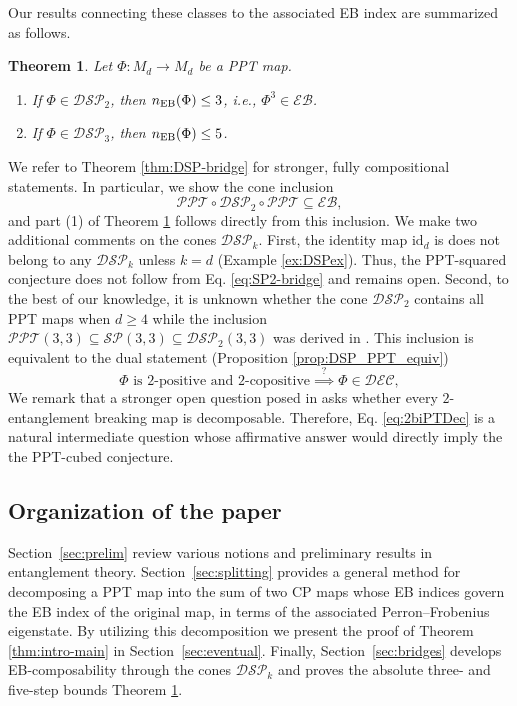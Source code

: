 \documentclass[11pt,reqno]{amsart}
\newtheorem{theorem}{Theorem}[section]
\theoremstyle{definition}
\theoremstyle{definition}
\theoremstyle{definition}
\theoremstyle{definition}
\newcommand{\id}{\mathrm{id}}
\newcommand{\SP}{\mathcal{SP}}
\newcommand{\DSP}{\mathcal{DSP}}
\newcommand{\EB}{\mathcal{EB}}
\newcommand{\PPT}{\mathcal{PPT}}
\newcommand{\DEC}{\mathcal{DEC}}
\begin{document}
Our results connecting these classes to the associated EB index are summarized as follows.

\begin{theorem}\label{thm:intro-low-bridge}
Let $\Phi:M_d\to M_d$ be a PPT map.
\begin{enumerate}
    \item If $\Phi\in \DSP_2$, then $n_{\rm EB}(\Phi)\leq 3$, i.e., $\Phi^3\in \EB$.
    
    \item If $\Phi\in \DSP_3$, then $n_{\rm EB}(\Phi)\leq 5$.
\end{enumerate}
\end{theorem}

We refer to Theorem \ref{thm:DSP-bridge} for stronger, fully compositional statements. In particular, we show the cone inclusion
\begin{equation} \label{eq:SP2-bridge}
    \PPT \circ \DSP_2 \circ \PPT \subseteq \EB,
\end{equation}
and part (1) of Theorem \ref{thm:intro-low-bridge} follows directly from this inclusion. We make two additional comments on the cones $\DSP_k$. First, the identity map $\id_d$ is does not belong to any $\DSP_k$ unless $k=d$ (Example \ref{ex:DSPex}). Thus, the PPT-squared conjecture does not follow from Eq. \eqref{eq:SP2-bridge} and remains open. Second, to the best of our knowledge, it is unknown whether the cone $\DSP_2$ contains all PPT maps when $d\geq 4$ while the inclusion $\PPT(3,3)\subseteq \SP(3,3)\subseteq \DSP_2(3,3)$ was derived in \cite{YLT16}. This inclusion is equivalent to the dual statement (Proposition \ref{prop:DSP_PPT_equiv})
\begin{equation} \label{eq:2biPTDec}
    \Phi \text{ is $2$-positive and $2$-copositive} \stackrel{?}{\implies}  \Phi\in \DEC,
\end{equation}
We remark that a stronger open question posed in \cite{DMS23} asks whether every 
$2$-entanglement breaking map is decomposable. Therefore, Eq. \eqref{eq:2biPTDec} is a natural intermediate question whose affirmative answer would directly imply the the PPT-cubed conjecture.

\subsection{Organization of the paper}

{
Section~\ref{sec:prelim} review various notions and preliminary results in entanglement theory. Section~\ref{sec:splitting} provides a general method for decomposing a PPT map into the sum of two CP maps whose EB indices govern the EB index of the original map, in terms of the associated Perron–Frobenius eigenstate. By utilizing this decomposition we present the proof of Theorem \ref{thm:intro-main} in  Section~\ref{sec:eventual}. Finally, Section~\ref{sec:bridges} develops EB-composability through the cones $\DSP_k$ and proves the absolute three- and five-step bounds Theorem \ref{thm:intro-low-bridge}.
}
\end{document}
